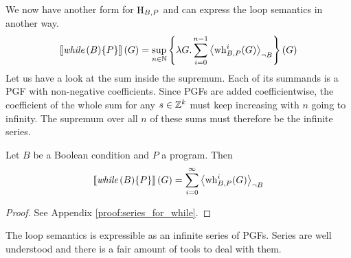 We now have another form for $\operatorname{H}_{B, P}$ and can express the loop semantics in another way.
\[ \left\llbracket \textit{while}\,(B) \{P\} \right\rrbracket(G)
	= \sup_{n \in \mathbb{N}} \left\{ \lambda G. \sum_{i = 0}^{n-1} \left\langle \operatorname{wh}_{B, P}^i(G) \right\rangle_{\lnot B} \right\}(G) \]
Let us have a look at the sum inside the supremum.
Each of its summands is a PGF with non-negative coefficients.
Since PGFs are added coefficientwise, the coefficient of the whole sum for any $s \in \mathbb{Z}^k$ must keep increasing with $n$ going to infinity.
The supremum over all $n$ of these sums must therefore be the infinite series.
\begin{theorem}[label=theo:ext:whilesmtx]
	Let $B$ be a Boolean condition and $P$ a program.
	Then \[ \left\llbracket \textit{while}\,(B) \{P\} \right\rrbracket(G) = \sum_{i = 0}^{\infty} \left\langle \operatorname{wh}_{B, P}^i(G) \right\rangle_{\lnot B} \]
	\begin{proof}
		See Appendix \ref{proof:series_for_while}.
	\end{proof}
\end{theorem}
The loop semantics is expressible as an infinite series of PGFs.
Series are well understood and there is a fair amount of tools to deal with them.